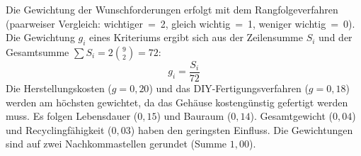 \documentclass[../main.tex]{subfiles}
\begin{document}
\endgroup

\bigskip\par
Die Gewichtung der Wunschforderungen erfolgt mit dem Rangfolgeverfahren
(paarweiser Vergleich: wichtiger~=~2, gleich wichtig~=~1, weniger wichtig~=~0).
Die Gewichtung $g_i$ eines Kriteriums ergibt sich aus der Zeilensumme $S_i$
und der Gesamtsumme $\sum S_i = 2\binom{9}{2} = 72$:
\begin{equation}
  g_i = \frac{S_i}{72}
\end{equation}
Die Herstellungskosten ($g = 0{,}20$) und das DIY-Fertigungsverfahren
($g = 0{,}18$) werden am höchsten gewichtet, da das Gehäuse kostengünstig gefertigt werden muss. Es folgen Lebensdauer ($0{,}15$) und Bauraum ($0{,}14$). Gesamtgewicht ($0{,}04$) und Recyclingfähigkeit ($0{,}03$) haben den geringsten Einfluss. Die Gewichtungen sind auf zwei Nachkommastellen gerundet (Summe $1{,}00$).
\end{document}
